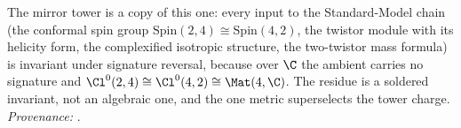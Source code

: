 The mirror tower is a copy of this one: every input to the Standard-Model chain (the conformal spin group $\mathrm{Spin}(2,4) \cong \mathrm{Spin}(4,2)$, the twistor module with its helicity form, the complexified isotropic structure, the two-twistor mass formula) is invariant under signature reversal, because over $\C$ the ambient carries no signature and $\Cl^{0}(2,4) \cong \Cl^{0}(4,2) \cong \Mat(4,\C)$. The residue is a soldered invariant, not an algebraic one, and the one metric superselects the tower charge. \emph{Provenance:} \cite[Thms.~3.5 and 4.3, Prop.~4.1]{ButlerT14}.
